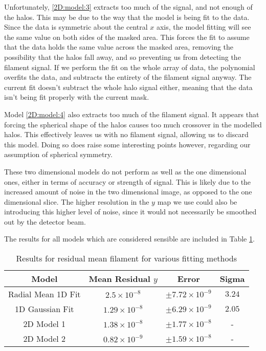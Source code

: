 \par Unfortunately, \ref{2D:model:3} extracts too much of the signal, and not enough of the halos. This may be due to the way that the model is being fit to the data. Since the data is symmetric about the central $x$ axis, the model fitting will see the same value on both sides of the masked area. This forces the fit to assume that the data holds the same value across the masked area, removing the possibility that the halos fall away, and so preventing us from detecting the filament signal. If we perform the fit on the whole array of data, the polynomial overfits the data, and subtracts the entirety of the filament signal anyway. The current fit doesn't subtract the whole halo signal either, meaning that the data isn't being fit properly with the current mask. 
\par Model \ref{2D:model:4} also extracts too much of the filament signal. It appears that forcing the spherical shape of the halos causes too much crossover in the modelled halos. This effectively leaves us with no filament signal, allowing us to discard this model. Doing so does raise some interesting points however, regarding our assumption of spherical symmetry. 


\par These two dimensional models do not perform as well as the one dimensional ones, either in terms of accuracy or strength of signal. This is likely due to the increased amount of noise in the two dimensional image, as opposed to the one dimensional slice. The higher resolution in the $y$ map we use could also be introducing this higher level of noise, since it would not necessarily be smoothed out by the detector beam. 

\par The results for all models which are considered sensible are included in Table \ref{table:results}. 

\begin{table}[H]
\centering
\begin{tabular}{||c c c c||} 
 \hline
 Model & Mean Residual $y$  & Error & Sigma\\
 \hline\hline
 Radial Mean 1D Fit & $2.5\times 10^{-8} $ & $\pm 7.72 \times 10^{-9}$ & $3.24$\\
 \hline
 1D Gaussian Fit & $1.29\times 10^{-8} $ &  $\pm 6.29 \times 10^{-9}$ & $2.05$\\
 \hline
 2D Model 1 & $1.38\times 10^{-8}$ & $\pm 1.77 \times 10^{-8}$ &  - \\
 \hline 
 2D Model 2 & $0.82 \times 10^{-9} $ &  $\pm 1.59 \times 10^{-8}$ & - \\
 \hline \hline 
\end{tabular}
\caption{Results for residual mean filament for various fitting methods }
\label{table:results}
\end{table}

